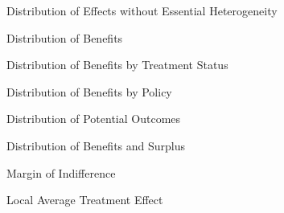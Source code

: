 \begin{frame}
\begin{figure}\caption{Distribution of Effects without Essential Heterogeneity}
\end{figure}
\end{frame}

\begin{frame}
\begin{figure}\caption{Distribution of Benefits}
\end{figure}
\end{frame}

\begin{frame}
\begin{figure}\caption{Distribution of Benefits by Treatment Status}
\end{figure}
\end{frame}

\begin{frame}
\begin{figure}\caption{Distribution of Benefits by Policy}
\end{figure}
\end{frame}

\begin{frame}
\begin{figure}\caption{Distribution of Potential Outcomes}
\end{figure}
\end{frame}

\begin{frame}
\begin{figure}\caption{Distribution of Benefits and Surplus}
\end{figure}
\end{frame}

\begin{frame}
\begin{figure}\caption{Margin of Indifference}
\end{figure}
\end{frame}

\begin{frame}
\begin{figure}\caption{Local Average Treatment Effect}
\end{figure}
\end{frame}

